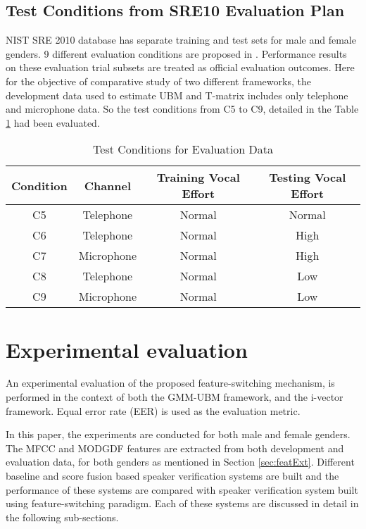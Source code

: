 \documentclass{article}
\begin{document}
\subsection{ \small \bf Test Conditions from SRE10 Evaluation Plan}
\label{subsec:test_conditions}
NIST SRE 2010 database has separate training  and test sets for male and female genders. 9 different evaluation conditions are proposed in  \cite{sre2010}. Performance results on these evaluation trial subsets are treated as official evaluation outcomes. Here for the objective of comparative study of two different frameworks, the development data used to estimate UBM and T-matrix includes only telephone and microphone data. So the test conditions from C5 to C9, detailed in the Table \ref{tab:testCond} had been evaluated.

\begin{table}[h!tb]
\centering
\caption{Test Conditions for Evaluation Data}
\begin{tabular}{|c|c|c|c|}
\hline
Condition & Channel & Training Vocal Effort & Testing Vocal Effort \\ 
\hline \hline
C5 & Telephone & Normal & Normal \\ \hline
C6 & Telephone & Normal & High \\ \hline
C7 & Microphone & Normal & High \\ \hline
C8 & Telephone & Normal & Low \\ \hline
C9 & Microphone & Normal & Low \\ \hline
\end{tabular}
\label{tab:testCond}
\end{table}

\section{Experimental evaluation}
\label{sec:ExpSetup}
An experimental evaluation of the proposed feature-switching
mechanism, is performed in the context of both the GMM-UBM framework, and the i-vector
framework. Equal error rate (EER) is used as the evaluation metric.

In this paper, the experiments are conducted for both male and female genders. The MFCC and MODGDF features are extracted from both development and evaluation data, for both genders as mentioned in Section \ref{sec:featExt}. Different baseline and score fusion based speaker verification systems are built and the performance of these systems are compared with speaker verification system built using feature-switching paradigm. Each of these systems are discussed in detail in the following sub-sections. 
\end{document}
